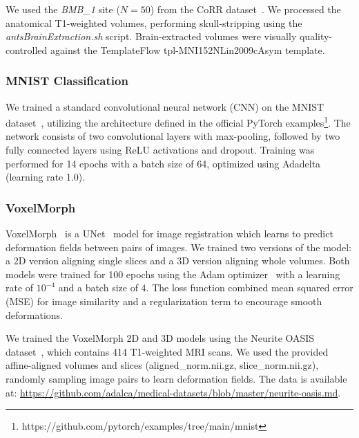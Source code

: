 \documentclass[runningheads]{llncs}
\begin{document}
We used the \textit{BMB\_1} site ($N=50$) from the CoRR
dataset~\cite{Zuo2014-ub}. We processed the anatomical T1-weighted volumes,
performing skull-stripping using the \textit{antsBrainExtraction.sh} script.
Brain-extracted volumes were visually quality-controlled against the
TemplateFlow tpl-MNI152NLin2009cAsym template.

\subsubsection{MNIST Classification}
We trained a standard convolutional neural network (CNN) on the MNIST
dataset~\cite{Deng2012-hh}, utilizing the architecture defined in the official
PyTorch examples\footnote{https://github.com/pytorch/examples/tree/main/mnist}.
The network consists of two convolutional layers with max-pooling, followed by
two fully connected layers using ReLU activations and dropout. Training was
performed for 14 epochs with a batch size of 64, optimized using
Adadelta~\cite{Zeiler2012-tn} (learning rate 1.0).

\subsubsection{VoxelMorph}
VoxelMorph~\cite{Balakrishnan2019-rx} is a UNet~\cite{Ronneberger2015-dn,
Isola2016-lu} model for image registration which learns to predict deformation
fields between pairs of images. We trained two versions of the model: a 2D
version aligning single slices and a 3D version aligning whole volumes. Both
models were trained for 100 epochs using the Adam optimizer~\cite{Kingma2014-uf}
with a learning rate of $10^{-4}$ and a batch size of 4. The loss function
combined mean squared error (MSE) for image similarity and a regularization term
to encourage smooth deformations.

We trained the VoxelMorph 2D and 3D models using the Neurite OASIS
dataset~\cite{Marcus2007-nm, Hoopes2022-is}, which contains 414 T1-weighted MRI
scans. We used the provided affine-aligned volumes and slices
(aligned\_norm.nii.gz, slice\_norm.nii.gz), randomly sampling image pairs to
learn deformation fields. The data is available at:
\url{https://github.com/adalca/medical-datasets/blob/master/neurite-oasis.md}.
\end{document}
